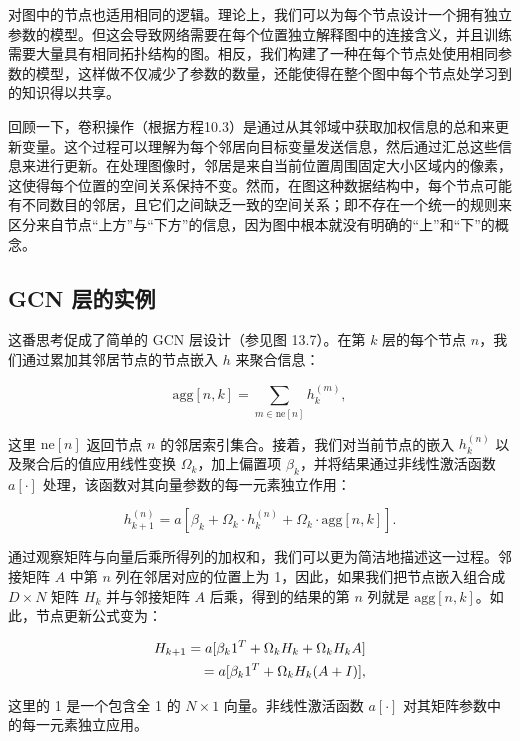 对图中的节点也适用相同的逻辑。理论上，我们可以为每个节点设计一个拥有独立参数的模型。但这会导致网络需要在每个位置独立解释图中的连接含义，并且训练需要大量具有相同拓扑结构的图。相反，我们构建了一种在每个节点处使用相同参数的模型，这样做不仅减少了参数的数量，还能使得在整个图中每个节点处学习到的知识得以共享。

回顾一下，卷积操作（根据方程10.3）是通过从其邻域中获取加权信息的总和来更新变量。这个过程可以理解为每个邻居向目标变量发送信息，然后通过汇总这些信息来进行更新。在处理图像时，邻居是来自当前位置周围固定大小区域内的像素，这使得每个位置的空间关系保持不变。然而，在图这种数据结构中，每个节点可能有不同数目的邻居，且它们之间缺乏一致的空间关系；即不存在一个统一的规则来区分来自节点“上方”与“下方”的信息，因为图中根本就没有明确的“上”和“下”的概念。

\subsection{GCN 层的实例}
这番思考促成了简单的 GCN 层设计（参见图 13.7）。在第 \(k\) 层的每个节点 \(n\)，我们通过累加其邻居节点的节点嵌入 \(h\) 来聚合信息：

\begin{equation}
\text{agg}[n, k] = \sum_{m \in \text{ne}[n]} h_k^{(m)}, 
\end{equation}

这里 \(\text{ne}[n]\) 返回节点 \(n\) 的邻居索引集合。接着，我们对当前节点的嵌入 \(h_k^{(n)}\) 以及聚合后的值应用线性变换 \(\Omega_k\)，加上偏置项 \(\beta_k\)，并将结果通过非线性激活函数 \(a[\cdot]\) 处理，该函数对其向量参数的每一元素独立作用：

\begin{equation}
h_{k+1}^{(n)} = a \left[ \beta_k + \Omega_k \cdot h_k^{(n)} + \Omega_k \cdot \text{agg}[n, k] \right]. 
\end{equation}

通过观察矩阵与向量后乘所得列的加权和，我们可以更为简洁地描述这一过程。邻接矩阵 \(A\) 中第 \(n\) 列在邻居对应的位置上为 1，因此，如果我们把节点嵌入组合成 \(D \times N\) 矩阵 \(H_k\) 并与邻接矩阵 \(A\) 后乘，得到的结果的第 \(n\) 列就是 \(\text{agg}[n, k]\)。如此，节点更新公式变为：


\begin{align}
H_{k+1} = a [\beta_{k} 1^T + \Omega_k H_k + \Omega_k H_k A] \notag \\
= a [\beta_{k} 1^T + \Omega_k H_k (A + I)], 
\end{align} 


这里的 1 是一个包含全 1 的 \(N \times 1\) 向量。非线性激活函数 \(a[\cdot]\) 对其矩阵参数中的每一元素独立应用。

